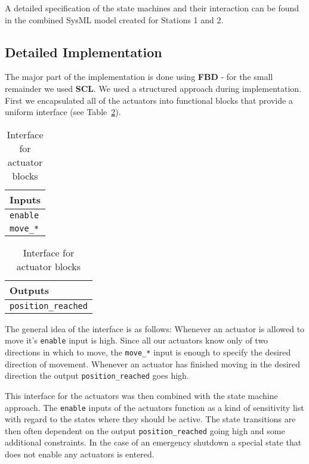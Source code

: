 \documentclass[12pt]{article}
\begin{document}
A detailed specification of the state machines and their interaction can be found in the
combined SysML model created for Stations 1 and 2.

\subsection{Detailed Implementation}

The major part of the implementation is done using \textbf{FBD} - for the small remainder we
used \textbf{SCL}.
We used a structured approach during implementation. First we encapsulated all of the actuators
into functional blocks that provide a uniform interface (see Table~\ref{table:interface}).

\begin{table}[h]
\begin{minipage}[b][1.5cm][t]{0.4\textwidth}
    \centering
    \begin{tabular}{|l|}
    Inputs \\
    \hline
    \texttt{enable}  \\
    \texttt{move\_*} \\
    \end{tabular}%
\end{minipage}%
\begin{minipage}[b][1.5cm][t]{0.4\textwidth}%
    \centering
    \begin{tabular}{|l|}
    Outputs \\
    \hline
     \texttt{position\_reached} \\
    \end{tabular}
\end{minipage}%
\caption{\label{table:interface} Interface for actuator blocks}
\end{table}

The general idea of the interface is as follows: Whenever an actuator is allowed to move it's \texttt{enable}
input is high. Since all our actuators know only of two directions in which to move, the \texttt{move\_*} input
is enough to specify the desired direction of movement. Whenever an actuator has finished moving in the
desired direction the output \texttt{position\_reached} goes high.

This interface for the actuators was then combined with the state machine approach. The \texttt{enable}
inputs of the actuators function as a kind of sensitivity list with regard to the states where they should be
active. The state transitions are then often dependent on the output \texttt{position\_reached} going high and
some additional constraints. In the case of an emergency shutdown a special state that does not enable any actuators is entered.
\end{document}
